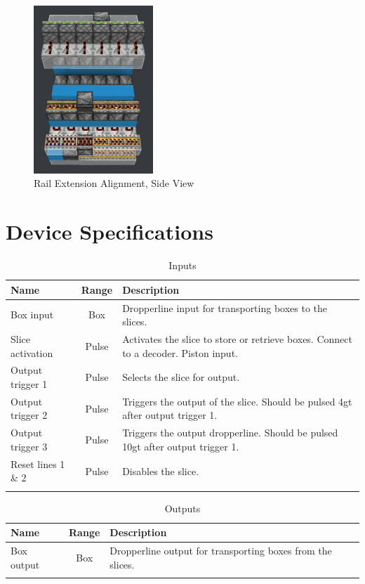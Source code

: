 \documentclass[10pt]{datasheet}
\begin{document}
\begin{figure}[H]
    \centering
    \includegraphics[width=0.4\textwidth]{ext2.png}
    \caption{\centering Rail Extension Alignment, Side View}
\end{figure}

\newpage
\section{Device Specifications}

\begin{table}[H]
    \caption{Inputs}
    \begin{tabularx}{\textwidth}{l | c | X}
        \thickhline
        \textbf{Name} & \textbf{Range} & \textbf{Description} \\
        \hline
        Box input & Box & Dropperline input for transporting boxes to the slices. \\
        \hline
        Slice activation & Pulse & Activates the slice to store or retrieve boxes. Connect to a decoder. Piston input. \\
        \hline
        Output trigger 1 & Pulse & Selects the slice for output. \\
        \hline
        Output trigger 2 & Pulse & Triggers the output of the slice. Should be pulsed 4gt after output trigger 1. \\
        \hline
        Output trigger 3 & Pulse & Triggers the output dropperline. Should be pulsed 10gt after output trigger 1. \\
        \hline
        Reset lines 1 \& 2 & Pulse & Disables the slice. \\
        \thickhline
\end{tabularx}
\end{table}

\begin{table}[H]
    \caption{Outputs}
    \begin{tabularx}{\textwidth}{l | c | X}
        \thickhline
        \textbf{Name} & \textbf{Range} & \textbf{Description} \\
        \hline
        Box output & Box & Dropperline output for transporting boxes from the slices. \\
        \thickhline
\end{tabularx}
\end{table}
\end{document}
